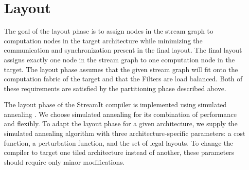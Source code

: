 \section{Layout}
\label{sec:layout}

The goal of the layout phase is to assign nodes in the stream graph to
computation nodes in the target architecture while minimizing the
communication and synchronization present in the final layout.  The
final layout assigns exactly one node in the stream graph to one
computation node in the target.  The layout phase assumes that the
given stream graph will fit onto the computation fabric of the target
and that the Filters are load balanced.  Both of these requirements
are satisfied by the partitioning phase described above.



The layout phase of the StreamIt compiler is implemented using
simulated annealing \cite{simanneal}.  We choose simulated annealing
for its combination of performance and flexibly.  To adapt the layout
phase for a given architecture, we supply the simulated annealing
algorithm with three architecture-specific parameters: a cost
function, a perturbation function, and the set of legal layouts.  To
change the compiler to target one tiled architecture instead of
another, these parameters should require only minor modifications.

